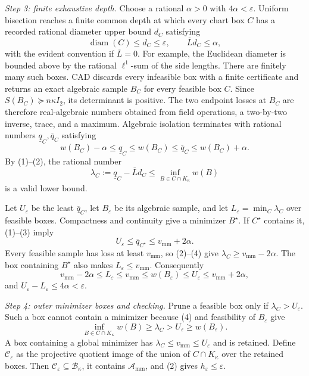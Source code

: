 \emph{Step 3: finite exhaustive depth.}
Choose a rational \(\alpha>0\) with \(4\alpha<\varepsilon\).  Uniform bisection reaches a finite common depth at which every chart box \(C\) has a recorded rational diameter upper bound \(d_C\) satisfying
\[
 \operatorname{diam}(C)\le d_C\le\varepsilon,
 \qquad \overline Ld_C\le\alpha,
 \tag{2}
\]
with the evident convention if \(\overline L=0\).  For example, the Euclidean diameter is bounded above by the rational \(\ell^1\)-sum of the side lengths.  There are finitely many such boxes.  CAD discards every infeasible box with a finite certificate and returns an exact algebraic sample \(B_C\) for every feasible box \(C\).  Since \(S(B_C)\succeq n\kappa I_2\), its determinant is positive.  The two endpoint losses at \(B_C\) are therefore real-algebraic numbers obtained from field operations, a two-by-two inverse, trace, and a maximum.  Algebraic isolation terminates with rational numbers \(\underline q_C,\overline q_C\) satisfying
\[
 w(B_C)-\alpha\le\underline q_C\le w(B_C)
 \le\overline q_C\le w(B_C)+\alpha.
 \tag{3}
\]
By (1)--(2), the rational number
\[
 \lambda_C:=\underline q_C-\overline Ld_C
 \le\inf_{B\in C\cap K_\kappa}w(B)
 \tag{4}
\]
is a valid lower bound.

Let \(U_\varepsilon\) be the least \(\overline q_C\), let \(B_\varepsilon\) be its algebraic sample, and let \(L_\varepsilon=\min_C\lambda_C\) over feasible boxes.  Compactness and continuity give a minimizer \(B^\star\).  If \(C^\star\) contains it, (1)--(3) imply
\[
 U_\varepsilon\le\overline q_{C^\star}
 \le v_{\mathrm{mm}}+2\alpha.
\]
Every feasible sample has loss at least \(v_{\mathrm{mm}}\), so (2)--(4) give \(\lambda_C\ge v_{\mathrm{mm}}-2\alpha\).  The box containing \(B^\star\) also makes \(L_\varepsilon\le v_{\mathrm{mm}}\).  Consequently
\[
 v_{\mathrm{mm}}-2\alpha
 \le L_\varepsilon\le v_{\mathrm{mm}}
 \le w(B_\varepsilon)\le U_\varepsilon
 \le v_{\mathrm{mm}}+2\alpha,
\]
and \(U_\varepsilon-L_\varepsilon\le4\alpha<\varepsilon\).

\emph{Step 4: outer minimizer boxes and checking.}
Prune a feasible box only if \(\lambda_C>U_\varepsilon\).  Such a box cannot contain a minimizer because (4) and feasibility of \(B_\varepsilon\) give
\[
 \inf_{B\in C\cap K_\kappa}w(B)
 \ge\lambda_C>U_\varepsilon\ge w(B_\varepsilon).
\]
A box containing a global minimizer has \(\lambda_C\le v_{\mathrm{mm}}\le U_\varepsilon\) and is retained.  Define \(\mathcal C_\varepsilon\) as the projective quotient image of the union of \(C\cap K_\kappa\) over the retained boxes.  Then \(\mathcal C_\varepsilon\subseteq\mathcal B_\kappa\), it contains \(\mathcal A_{\mathrm{mm}}\), and (2) gives \(h_\varepsilon\le\varepsilon\).

